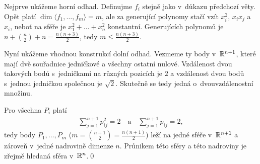 \dk Nejprve ukážeme horní odhad. Definujme $f_i$ stejně jako v~důkazu předchozí věty. Opět platí $\dim\langle f_1,\dots,f_m\rangle=m$, ale za generující polynomy stačí vzít $x_i^2$, $x_ix_j$ a $x_i$, neboť na sféře je $x_1^2+\dots+x_n^2$ konstantní. Generujících polynomů je $n+{n \choose 2}+n=\frac{n(n+3)}2$, tedy $m\leq\frac{n(n+3)}2$.

Nyní ukážeme vhodnou konstrukcí dolní odhad. Vezmeme ty body v~$\mathbb{R}^{n+1}$, které mají dvě souřadnice jedničkové a všechny ostatní nulové. Vzdálenost dvou takových bodů s~jedničkami na různých pozicích je $2$ a vzdálenost dvou bodů s~jednou jedničkou společnou je $\sqrt 2$. Skutečně se tedy jedná o~dvouvzdálenostní množinu.

Pro všechna $P_i$ platí
\begin{align}
\sum_{j=1}^{n+1}p_{ij}^2=2\quad\text{a}\quad\sum_{j=1}^{n+1}p_{ij}=2,
\end{align}
tedy body $P_1,\dots,P_m$ ($m={n+1\choose2}=\frac{n(n+1)}2$) leží na jedné sféře v~$\mathbb{R}^{n+1}$ a zároveň v~jedné nadrovině dimenze $n$. Průnikem této sféry a této nadroviny je zřejmě hledaná sféra v~$\mathbb{R}^n$.\qed